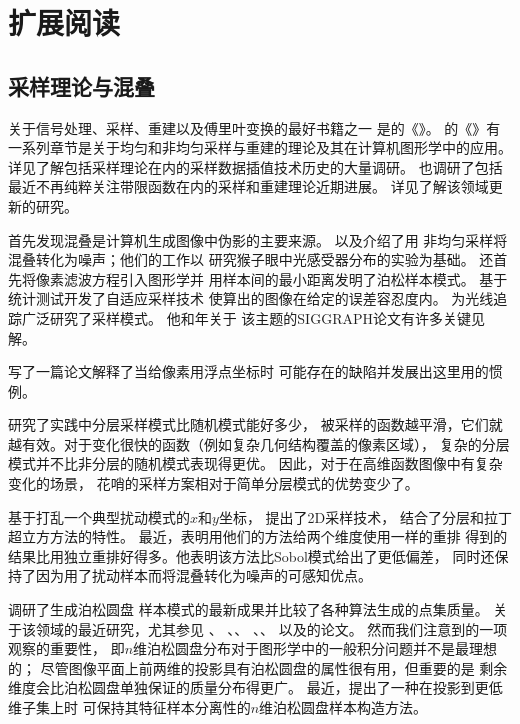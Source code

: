 \section{扩展阅读}\label{sec:扩展阅读07}
\subsection{采样理论与混叠}\label{sub:采样理论与混叠}
关于信号处理、采样、重建以及傅里叶变换的最好书籍之一
是\citeauthor{91250711}的《》\parencite*{91250711}。
\citeauthor{GLASSNER1995}的《》\parencite*{GLASSNER1995}有
一系列章节是关于均匀和非均匀采样与重建的理论及其在计算机图形学中的应用。
详见\citet{993400}了解包括采样理论在内的采样数据插值技术历史的大量调研。
\citet{843002}也调研了包括最近不再纯粹关注带限函数在内的采样和重建理论近期进展。
详见\citet{4815542}了解该领域更新的研究。

\citet{10.1145/359863.359869}首先发现混叠是计算机生成图像中伪影的主要来源。
\citet{10.1145/7529.8927}以及\citet{10.1145/325334.325182}介绍了用
非均匀采样将混叠转化为噪声；他们的工作以\citet{10.1126/science.6867716}
研究猴子眼中光感受器分布的实验为基础。
\citeauthor{10.1145/325334.325182}还首先将像素滤波方程引入图形学并
用样本间的最小距离发明了泊松样本模式。
\citet{10.1145/325334.325179}基于统计测试开发了自适应采样技术
使算出的图像在给定的误差容忍度内。
\citeauthor{10.1145/37401.37410}为光线追踪广泛研究了采样模式。
他\cite*{10.1145/37401.37410}和\cite*{10.1145/122718.122736}年关于
该主题的SIGGRAPH论文有许多关键见解。

\citet{HECKBERT1990246}写了一篇论文解释了当给像素用浮点坐标时
可能存在的缺陷并发展出这里用的惯例。

\citet{10.1145/237170.237265}研究了实践中分层采样模式比随机模式能好多少，
被采样的函数越平滑，它们就越有效。对于变化很快的函数（例如复杂几何结构覆盖的像素区域），
复杂的分层模式并不比非分层的随机模式表现得更优。
因此，对于在高维函数图像中有复杂变化的场景，
花哨的采样方案相对于简单分层模式的优势变少了。

\citet{CHIU1994370}基于打乱一个典型扰动模式的$x$和$y$坐标，
提出了2D采样技术，
结合了分层和拉丁超立方方法的特性。
最近，\citet{Kensler2013Pixar}表明用他们的方法给两个维度使用一样的重排
得到的结果比用独立重排好得多。他表明该方法比Sobol模式给出了更低偏差，
同时还保持了因为用了扰动样本而将混叠转化为噪声的可感知优点。

\citet{10.1111/j.1467-8659.2007.01100.x}调研了生成泊松圆盘
样本模式的最新成果并比较了各种算法生成的点集质量。
关于该领域的最近研究，尤其参见\citet{10.1080/2151237X.2006.10129217}
、
\citet{10.1145/1179352.1141915}、\citet{10.1145/1399504.1360619}、
\citet{10.1145/1866158.1866189}、\citet{10.1145/1964921.1964944}、
以及\citet{10.1111/j.1467-8659.2012.03059.x}的论文。
然而我们注意到\citet{10.1145/122718.122736}的一项观察的重要性，
即$n$维泊松圆盘分布对于图形学中的一般积分问题并不是最理想的；
尽管图像平面上前两维的投影具有泊松圆盘的属性很有用，但重要的是
剩余维度会比泊松圆盘单独保证的质量分布得更广。
最近，\citet{10.1111/cgf.12725}提出了一种在投影到更低维子集上时
可保持其特征样本分离性的$n$维泊松圆盘样本构造方法。

